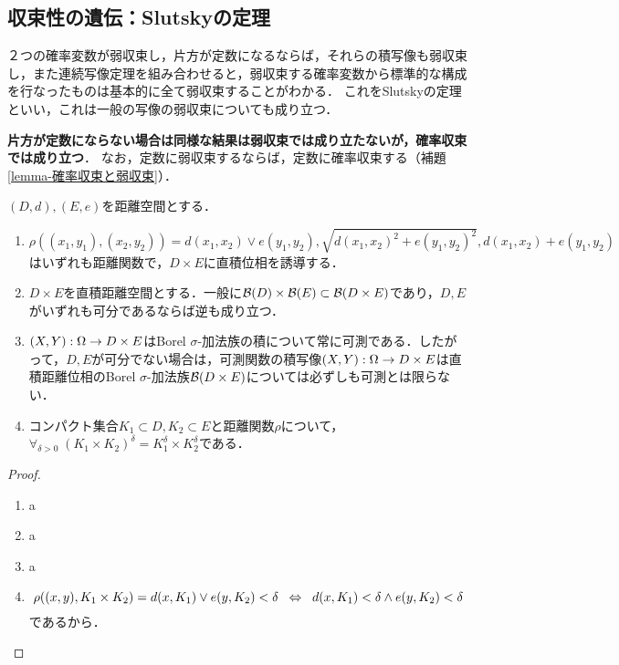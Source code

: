 \documentclass[uplatex,dvipdfmx]{jsreport}
\begin{document}
\subsection{収束性の遺伝：Slutskyの定理}

\begin{tcolorbox}[colframe=ForestGreen, colback=ForestGreen!10!white,breakable,colbacktitle=ForestGreen!40!white,coltitle=black,fonttitle=\bfseries\sffamily,
title=Prokhorovの定理で迂回できる]
    ２つの確率変数が弱収束し，片方が定数になるならば，それらの積写像も弱収束し，また連続写像定理を組み合わせると，弱収束する確率変数から標準的な構成を行なったものは基本的に全て弱収束することがわかる．
    これをSlutskyの定理といい，これは一般の写像の弱収束についても成り立つ．

    \textbf{片方が定数にならない場合は同様な結果は弱収束では成り立たないが，確率収束では成り立つ}．
    なお，定数に弱収束するならば，定数に確率収束する（補題\ref{lemma-確率収束と弱収束}）．
\end{tcolorbox}

\begin{lemma}[直積距離空間]\label{lemma-product-metric-space}
    $(D,d),(E,e)$を距離空間とする．
    \begin{enumerate}
        \item $\rho((x_1,y_1),(x_2,y_2))=d(x_1,x_2)\lor e(y_1,y_2),\sqrt{d(x_1,x_2)^2+e(y_1,y_2)^2},d(x_1,x_2)+e(y_1,y_2)$はいずれも距離関数で，$D\times E$に直積位相を誘導する．
        \item $D\times E$を直積距離空間とする．一般に$\mathcal{B}(D)\times\mathcal{B}(E)\subset\mathcal{B}(D\times E)$であり，$D,E$がいずれも可分であるならば逆も成り立つ．
        \item $(X,Y):\Omega\to D\times E$はBorel $\sigma$-加法族の積について常に可測である．したがって，$D,E$が可分でない場合は，可測関数の積写像$(X,Y):\Omega\to D\times E$は直積距離位相のBorel $\sigma$-加法族$\mathcal{B}(D\times E)$については必ずしも可測とは限らない．
        \item コンパクト集合$K_1\subset D,K_2\subset E$と距離関数$\rho$について，$\forall_{\delta>0}\;(K_1\times K_2)^\delta=K_1^\delta\times K_2^\delta$である．
    \end{enumerate}
\end{lemma}
\begin{proof}\mbox{}
    \begin{enumerate}
        \item a
        \item a
        \item a
        \item 
        \[\rho((x,y),K_1\times K_2)=d(x,K_1)\lor e(y,K_2)<\delta\;\;\Leftrightarrow\;\; d(x,K_1)<\delta\land e(y,K_2)<\delta\]
        であるから．
    \end{enumerate}
\end{proof}
\end{document}
